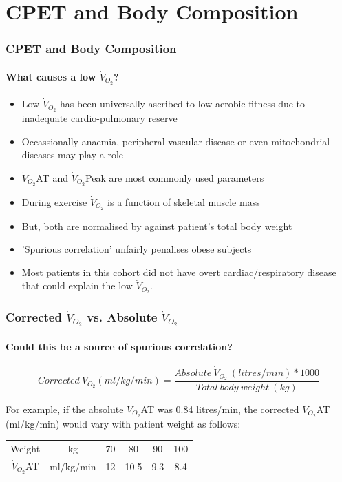 \documentclass[10pt]{beamer}
\begin{document}
\section[Chapter 4]{CPET and Body Composition}

\begin{frame}
	\frametitle{ CPET and Body Composition}
	\framesubtitle{What causes a low $\dot{V}_{O_2}$? }
	\begin{itemize}
		\item Low $\dot{V}_{O_2}$ has been universally ascribed to low aerobic fitness due to inadequate cardio-pulmonary reserve
		\item Occassionally anaemia, peripheral vascular disease or even mitochondrial diseases may play a role
		\item $\dot{V}_{O_2}$AT and $\dot{V}_{O_2}$Peak are most commonly used parameters
		\item During exercise $\dot{V}_{O_2}$ is a function of skeletal muscle mass
		\item But, both are normalised by against patient's total body weight
		\item 'Spurious correlation' unfairly penalises obese subjects
		\item Most patients in this cohort did not have overt cardiac/respiratory disease that could explain the low $\dot{V}_{O_2}$.
	\end{itemize}
\end{frame}

\begin{frame}
	\frametitle{Corrected $\dot{V}_{O_2}$ vs. Absolute $\dot{V}_{O_2}$}
	\framesubtitle{Could this be a source of spurious correlation?}
	
	\[Corrected\ \dot{V}_{O_2} (ml/kg/min) = \frac{Absolute\ \dot{V}_{O_2}\ (litres/min) * 1000}{Total\ body\ weight\ (kg)}\]

	\vfill
	
	For example, if the absolute $\dot{V}_{O_2}$AT was 0.84 litres/min, the corrected $\dot{V}_{O_2}$AT (ml/kg/min) would vary with patient weight as follows:
	
	\begin{table}
	\begin{tabular}{c c c c c c}
		     Weight       & kg        & 70 & 80   & 90  & 100 \\
		$\dot{V}_{O_2}$AT & ml/kg/min & 12 & 10.5 & 9.3 & 8.4
	\end{tabular}
	\end{table}


\end{frame}
\end{document}
